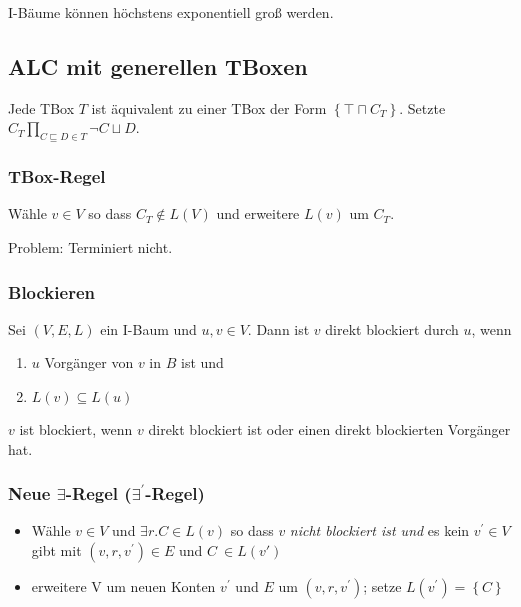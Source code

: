 I-Bäume können höchstens exponentiell groß werden.

\subsection{ALC mit generellen TBoxen}\label{alc-mit-generellen-tboxen}

Jede TBox $T$ ist äquivalent zu einer TBox der Form
$\left\{ \top \sqcap C_{T} \right\}$. Setzte
$C_{T} \prod_{C \sqsubseteq D \in T}^{}{\neg C \sqcup D}$.

\subsubsection{TBox-Regel}\label{tbox-regel}

Wähle $v \in V$ so dass $C_{T} \notin L\left( V \right)$ und
erweitere $L\left( v \right)$ um $C_{T}$.

Problem: Terminiert nicht.

\subsubsection{Blockieren}\label{blockieren}

Sei $\left( V,E,L \right)$ ein I-Baum und $u,v \in V$. Dann ist
$v$ direkt blockiert durch $u$, wenn

\begin{enumerate}
\def\labelenumi{\arabic{enumi}.}
\item
  $u$ Vorgänger von $v$ in $B$ ist und
\item
  $L\left( v \right) \subseteq L\left( u \right)$
\end{enumerate}

$v$ ist blockiert, wenn $v$ direkt blockiert ist oder einen direkt
blockierten Vorgänger hat.

\subsubsection{\texorpdfstring{Neue $\exists$-Regel
($\exists^{'}$-Regel)}{Neue \textbackslash{}exists-Regel (\textbackslash{}exists\^{}\{'\}-Regel)}}\label{neue-exists-regel-exists-regel}

\begin{itemize}
\item
  Wähle $v \in V$ und $\exists r.C \in L\left( v \right)$ so dass
  $v$ \emph{nicht blockiert ist und} es kein $v^{'} \in V$ gibt mit
  $\left( v,r,v^{'} \right) \in E$ und $C\  \in L\left( v' \right)$
\item
  erweitere V um neuen Konten $v^{'}$ und $E$ um
  $\left( v,r,v^{'} \right)$; setze
  $L\left( v^{'} \right) = \left\{ C \right\}$
\end{itemize}

